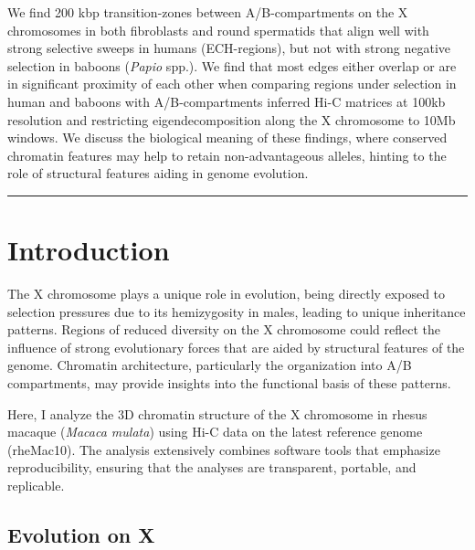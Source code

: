\documentclass[
  11pt,
  a4paper,
]{scrbook}
\renewcommand*\contentsname{Table of contents}
\newcommand\contentsname{Table of contents}
\begin{document}
{\begin{minipage}{.8\textwidth}
We find 200 kbp transition-zones between A/B-compartments on the X
chromosomes in both fibroblasts and round spermatids that align well
with strong selective sweeps in humans (ECH-regions), but not with
strong negative selection in baboons (\emph{Papio} spp.). We find that
most edges either overlap or are in significant proximity of each other
when comparing regions under selection in human and baboons with
A/B-compartments inferred Hi-C matrices at 100kb resolution and
restricting eigendecomposition along the X chromosome to 10Mb windows.
We discuss the biological meaning of these findings, where conserved
chromatin features may help to retain non-advantageous alleles, hinting
to the role of structural features aiding in genome
evolution. %
    \par %
    \vspace{2em} %
    \hspace*{\fill}\rule{0.5\textwidth}{0.4pt}\hspace*{\fill} %
\end{minipage}
\vspace*{\fill} %

}
\renewcommand*\contentsname{Table of contents}
{
\setcounter{tocdepth}{2}
\tableofcontents
}

\mainmatter
\chapter{Introduction}\label{introduction}

The X chromosome plays a unique role in evolution, being directly
exposed to selection pressures due to its hemizygosity in males, leading
to unique inheritance patterns. Regions of reduced diversity on the X
chromosome could reflect the influence of strong evolutionary forces
that are aided by structural features of the genome. Chromatin
architecture, particularly the organization into A/B compartments, may
provide insights into the functional basis of these patterns.

Here, I analyze the 3D chromatin structure of the X chromosome in rhesus
macaque (\emph{Macaca mulata}) using Hi-C data on the latest reference
genome (rheMac10). The analysis extensively combines software tools that
emphasize reproducibility, ensuring that the analyses are transparent,
portable, and replicable.

\section{Evolution on X}\label{evolution-on-x}
\end{document}

